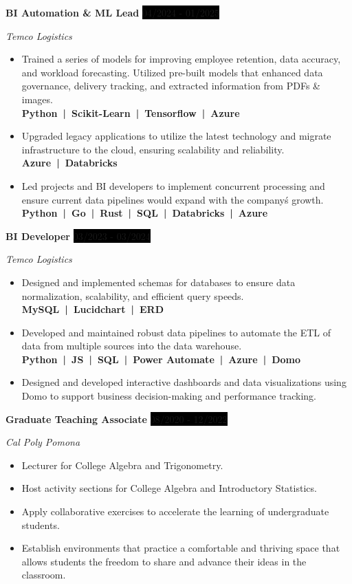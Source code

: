 \documentclass[paper=a4,fontsize=10pt]{scrartcl} %
\newcommand{\sepspace}{\vspace*{1em}}		%
\newcommand{\EducationEntry}[4]{
		\noindent \textbf{#1} \hfill      %
		\colorbox{Black}{%
			\parbox{5em}{%
			\hfill\color{White}#2}} \par  %
		\noindent \textit{#3} \par        %
		\noindent\hangindent=2em\hangafter=0 \small #4 %
		\normalsize \par}
\newcommand{\WorkEntry}[4]{				  %
		\noindent \textbf{#1} \hfill      %
		\colorbox{Black}{\color{White}#2} \par  %
		\noindent \textit{#3} \par              %
		\noindent \small #4 %
		\normalsize}
\begin{document}
\WorkEntry{BI Automation \& ML Lead}
{04/2024 - 01/2025}
{Temco Logistics}
{\begin{itemize}[leftmargin=*]
    \item 
        Trained a series of models for improving employee retention, 
        data accuracy, and workload forecasting. Utilized pre-built 
        models that enhanced data governance, delivery tracking, and 
        extracted information from PDFs \& images.\\ 
        \scriptsize{\textbf{Python~|~Scikit-Learn~|~Tensorflow~|~Azure}}\small
    \item 
        Upgraded legacy applications to utilize the latest technology 
        and migrate infrastructure to the cloud, ensuring scalability 
        and reliability.\\
        \scriptsize{\textbf{Azure~|~Databricks}}\small
    \item
        Led projects and BI developers to implement concurrent processing 
        and ensure current data pipelines would expand with the company\'s 
        growth.\\
        \scriptsize{\textbf{Python~|~Go~|~Rust~|~SQL~|~Databricks~|~Azure}}\small
\end{itemize}}

\sepspace

\WorkEntry{BI Developer}
{03/2023 - 03/2024}
{Temco Logistics}
{\begin{itemize}[leftmargin=*]
    \item
        Designed and implemented schemas for databases to ensure data 
        normalization, scalability, and efficient query speeds.\\
        \scriptsize{\textbf{MySQL~|~Lucidchart~|~ERD}}\small
    \item
        Developed and maintained robust data pipelines to automate the ETL 
        of data from multiple sources into the data warehouse.\\
        \scriptsize{\textbf{Python~|~JS~|~SQL~|~Power Automate~|~Azure~|~Domo}}\small
    \item
        Designed and developed interactive dashboards and data visualizations 
        using Domo to support business decision-making and performance tracking.
\end{itemize}}

\sepspace

\WorkEntry{Graduate Teaching Associate}
{08/2020 - 12/2022}
{Cal Poly Pomona}
{\begin{itemize}[leftmargin=*]
    \item Lecturer for College Algebra and Trigonometry.
    \item Host activity sections for College Algebra and Introductory Statistics.
    \item Apply collaborative exercises to accelerate the learning of undergraduate students.
    \item Establish environments that practice a comfortable and thriving space that allows students the freedom to share and advance their ideas in the classroom.
\end{itemize}}
\end{document}
